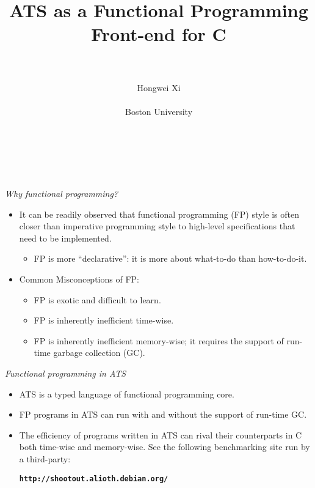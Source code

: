 \documentclass[pdf]{prosper}
\title{\huge\bf ATS as a Functional Programming Front-end for C}
\author{~\\~\\
{\large Hongwei Xi} \\~\\
{\large Boston University} \\~\\~\\~\\
\institution{Work partly funded by NSF}}
\begin{document}
\maketitle
\begin{slide}{\em Why functional programming?}
\begin{itemize}
\item
It can be readily observed that functional programming (FP) style is often
closer than imperative programming style to high-level specifications that
need to be implemented.

\begin{itemize}
\item FP is more ``declarative'': it is more about what-to-do than how-to-do-it.
\end{itemize}

\item
Common Misconceptions of FP:
\begin{itemize}
\item FP is exotic and difficult to learn.
\item FP is inherently inefficient time-wise.
\item FP is inherently inefficient memory-wise; it requires the support of run-time garbage collection (GC).
\end{itemize}

\end{itemize}
\end{slide}
\begin{slide}{\em Functional programming in ATS}
\begin{itemize}
\item ATS is a typed language of functional programming core.
\item FP programs in ATS can run with and without the support of run-time GC.
\item
The efficiency of programs written in ATS can rival their counterparts in
C both time-wise and memory-wise. See the following benchmarking site
run by a third-party:
\begin{center}
\texttt{\bf http://shootout.alioth.debian.org/}
\end{center}
\end{itemize}
\end{slide}
\end{document}
